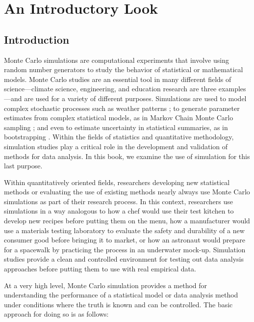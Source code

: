 \documentclass[
]{book}
\begin{document}
\part{An Introductory Look}\label{part-an-introductory-look}

\chapter{Introduction}\label{introduction}

Monte Carlo simulations are computational experiments that involve using random number generators to study the behavior of statistical or mathematical models.
Monte Carlo studies are an essential tool in many different fields of science---climate science, engineering, and education research are three examples---and are used for a variety of different purposes.
Simulations are used to model complex stochastic processes such as weather patterns \citep{jones2012IntroductionScientificProgramming, robert2010IntroducingMonteCarlo};
to generate parameter estimates from complex statistical models, as in Markov Chain Monte Carlo sampling \citep{gelman2013BayesianDataAnalysis};
and even to estimate uncertainty in statistical summaries, as in bootstrapping \citep{davison1997BootstrapMethodsTheir}.
Within the fields of statistics and quantitative methodology, simulation studies play a critical role in the development and validation of methods for data analysis.
In this book, we examine the use of simulation for this last purpose.

Within quantitatively oriented fields, researchers developing new statistical methods or evaluating the use of existing methods nearly always use Monte Carlo simulations as part of their research process.
In this context, researchers use simulations in a way analogous to how a chef would use their test kitchen to develop new recipes before putting them on the menu, how a manufacturer would use a materials testing laboratory to evaluate the safety and durability of a new consumer good before bringing it to market, or how an astronaut would prepare for a spacewalk by practicing the process in an underwater mock-up.
Simulation studies provide a clean and controlled environment for testing out data analysis approaches before putting them to use with real empirical data.

At a very high level, Monte Carlo simulation provides a method for understanding the performance of a statistical model or data analysis method under conditions where the truth is known and can be controlled.
The basic approach for doing so is as follows:
\end{document}
